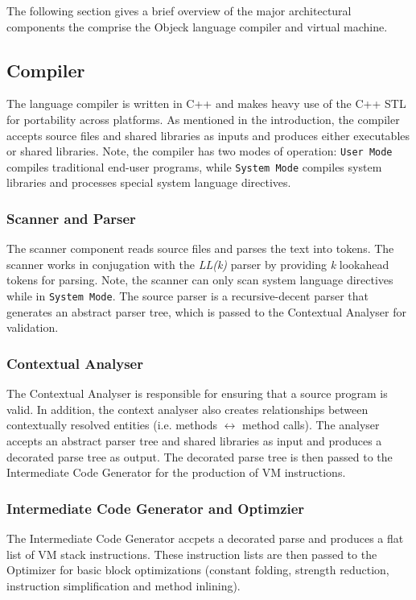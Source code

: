 \documentclass[12pt]{article}
\begin{document}
The following section gives a brief overview of the major architectural components the comprise the Objeck language compiler and virtual machine.

\subsection{Compiler}
The language compiler is written in C++ and makes heavy use of the C++ STL for portability across platforms.  As mentioned in the introduction, the compiler accepts source files and shared libraries as inputs and produces either executables or shared libraries.  Note, the compiler has two modes of operation: \texttt{User Mode} compiles traditional end-user programs, while \texttt{System Mode} compiles system libraries and processes special system language directives.

\subsubsection{Scanner and Parser}
The scanner component reads source files and parses the text into tokens.  The scanner works in conjugation with the \emph{LL(k)} parser by providing \emph{k} lookahead tokens for parsing.  Note, the scanner can only scan system language directives while in \texttt{System Mode}.  The source parser is a recursive-decent parser that generates an abstract parser tree, which is passed to the Contextual Analyser for validation.

\subsubsection{Contextual Analyser}
The Contextual Analyser is responsible for ensuring that a source program is valid.  In addition, the context analyser also creates relationships between contextually resolved entities (i.e. methods $\longleftrightarrow$ method calls).  The analyser accepts an abstract parser tree and shared libraries as input and produces a decorated parse tree as output.  The decorated parse tree is then passed to the Intermediate Code Generator for the production of VM instructions.

\subsubsection{Intermediate Code Generator and Optimzier}
The Intermediate Code Generator accpets a decorated parse and produces a flat list of VM stack instructions.  These instruction lists are then passed to the Optimizer for basic block optimizations (constant folding, strength reduction, instruction simplification and method inlining).
\end{document}

